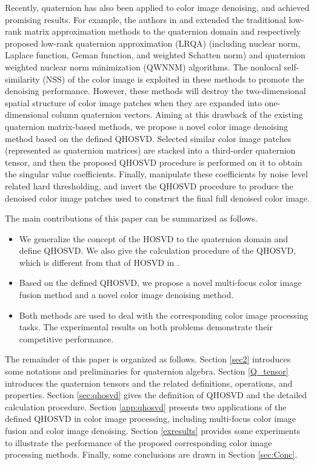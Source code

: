 \documentclass[journal]{IEEEtran}
\begin{document}
Recently, quaternion has also been applied to color image denoising, and achieved promising results.
For example, the authors in \cite{DBLP:journals/ijon/YuZY19} and \cite{DBLP:journals/tip/ChenXZ20} extended the traditional low-rank matrix approximation 
methods to the quaternion domain and respectively proposed low-rank quaternion approximation (LRQA)  (including nuclear norm, Laplace function, Geman function, and weighted Schatten norm) and quaternion weighted nuclear norm minimization (QWNNM) algorithms. The nonlocal self-similarity (NSS) of the color image is exploited in these methods to promote the denoising performance. However, these methods will destroy the two-dimensional spatial structure of color image patches when they are expanded into one-dimensional column quaternion vectors. Aiming at this drawback of the existing quaternion matrix-based methods, we propose a novel color image denoising method based on the defined QHOSVD.  Selected similar color image patches (represented as quaternion matrices) are stacked into a third-order quaternion tensor, and then the proposed QHOSVD procedure is performed on it to obtain the singular value coefficients. Finally, manipulate these coefficients by noise level related hard thresholding, and invert the QHOSVD procedure to produce the denoised color image patches used to construct the final full denoised color image.

 The main contributions of this paper can be
summarized as follows.
\begin{itemize}
	\item We generalize the concept of the HOSVD to the quaternion domain and define QHOSVD. We also give the calculation procedure of the QHOSVD, which is different from that of HOSVD in \cite{DBLP:journals/siammax/LathauwerMV00}.
	\item Based on the defined QHOSVD, we propose a novel multi-focus color image fusion method and a novel color image denoising method.
	\item Both methods are used to deal with the corresponding color image processing tasks. The experimental results on both problems demonstrate their competitive performance.
\end{itemize}

The remainder of this paper is organized as follows. Section \ref{sec2} introduces some notations and preliminaries for quaternion algebra. Section \ref{Q_tensor} introduces the quaternion tensors and the related definitions, operations, and properties. Section \ref{sec:qhosvd} gives the definition of QHOSVD and the detailed calculation procedure.  Section \ref{app:qhosvd} presents two applications of the defined QHOSVD in color image processing, including multi-focus color image fusion and color image denoising. Section \ref{exresults} provides some experiments to illustrate the performance of the proposed corresponding color image processing methods. Finally, some conclusions are drawn in Section \ref{sec:Conc}.
\end{document}
